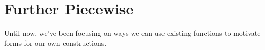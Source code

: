\section{Further Piecewise}
Until now, we've been focusing on ways we can use existing functions to motivate forms for our own constructions.


\newpage